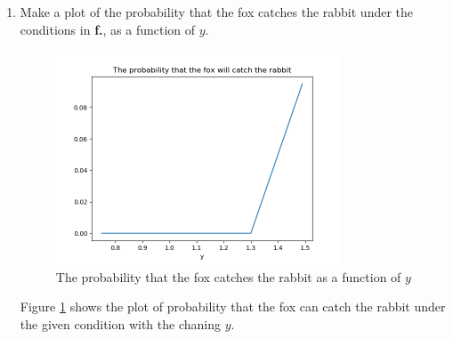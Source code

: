 \documentclass[preprint,12pt]{elsarticle}
\begin{document}
\begin{enumerate}
        \item Make a plot of the probability that the fox catches the rabbit
        under the conditions in \textbf{f.}, as a function of $y$.
        \begin{figure}[htbp!]
            \center
            \includegraphics[width=0.8\textwidth]{9.png}
            \caption{The probability that the fox catches the rabbit as a function of $y$}
            \label{fig:9}
        \end{figure}
        Figure \ref{fig:9} shows the plot of probability that the fox can catch
        the rabbit under the given condition with the chaning $y$.
        \end{enumerate}
\end{document}

